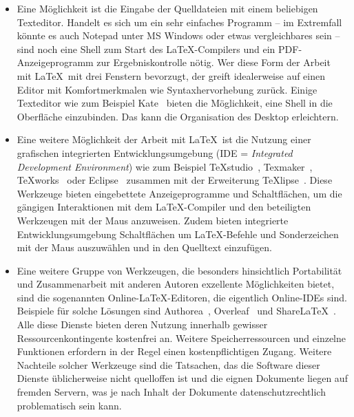 \documentclass[a4paper,10pt,twoside]{scrbook}
\begin{document}
\begin{itemize}
	\item Eine Möglichkeit ist die Eingabe der Quelldateien mit einem beliebigen Texteditor. Handelt es sich um ein sehr einfaches Programm -- im Extremfall könnte es auch Notepad unter MS Windows oder etwas vergleichbares sein -- sind noch eine Shell zum Start des \LaTeX-Compilers und ein PDF-Anzeigeprogramm zur Ergebniskontrolle nötig. Wer diese Form der Arbeit mit \LaTeX\ mit drei Fenstern bevorzugt, der greift idealerweise auf einen Editor mit Komfortmerkmalen wie Syntaxhervorhebung zurück.
	Einige Texteditor wie zum Beispiel Kate~\cite{Katewebpage} bieten die Möglichkeit, eine Shell in die Oberfläche einzubinden. Das kann die Organisation des Desktop erleichtern.
    
    \item Eine weitere Möglichkeit der Arbeit mit \LaTeX\ ist die Nutzung einer grafischen integrierten Entwicklungsumgebung (IDE = \textsl{Integrated Development Environment}) wie zum Beispiel \TeX studio~\cite{TeXstudioWebseite}, Texmaker~\cite{TeXmakerWebseite}, TeXworks~\cite{TeXworksWebseite} oder Eclipse~\cite{EclipseWebseite} zusammen mit der Erweiterung TeXlipse~\cite{TeXlipseWebseite}. Diese Werkzeuge bieten eingebettete Anzeigeprogramme und Schaltflächen, um die gängigen Interaktionen mit dem \LaTeX-Compiler und den beteiligten Werkzeugen mit der Maus anzuweisen. Zudem bieten integrierte Entwicklungsumgebung Schaltflächen um \LaTeX-Befehle und Sonderzeichen mit der Maus auszuwählen und in den Quelltext einzufügen.

    \item Eine weitere Gruppe von Werkzeugen, die besonders hinsichtlich Portabilität und Zusammenarbeit mit anderen Autoren exzellente Möglichkeiten bietet, sind die sogenannten Online-\LaTeX-Editoren, die eigentlich Online-IDEs sind. Beispiele für solche Lösungen sind Authorea~\cite{AuthoreaWebseite}, Overleaf~\cite{OverleafWebseite} und ShareLaTeX~\cite{ShareLaTeXWebseite}. Alle diese Dienste bieten deren Nutzung innerhalb gewisser Ressourcenkontingente kostenfrei an. Weitere Speicherressourcen und einzelne Funktionen erfordern in der Regel einen kostenpflichtigen Zugang. Weitere Nachteile solcher Werkzeuge sind die Tatsachen, das die Software dieser Dienste üblicherweise nicht quelloffen ist und die eignen Dokumente liegen auf fremden Servern, was je nach Inhalt der Dokumente datenschutzrechtlich problematisch sein kann.
\end{itemize}
\end{document}
